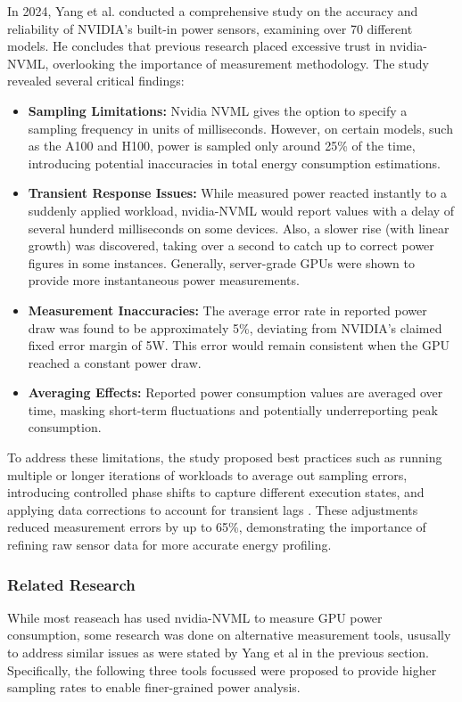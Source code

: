 In 2024, Yang et al. conducted a comprehensive study on the accuracy and reliability of NVIDIA's built-in power sensors, examining over 70 different models\cite{yang2024accurate}. He concludes that previous research placed excessive trust in nvidia-NVML, overlooking the importance of measurement methodology. The study revealed several critical findings:
\begin{itemize}
    \item \textbf{Sampling Limitations:} Nvidia NVML gives the option to specify a sampling frequency in units of milliseconds. However, on certain models, such as the A100 and H100, power is sampled only around 25\% of the time, introducing potential inaccuracies in total energy consumption estimations.
    \item \textbf{Transient Response Issues:} While measured power reacted instantly to a suddenly applied workload, nvidia-NVML would report values with a delay of several hunderd milliseconds on some devices. Also, a slower rise (with linear growth) was discovered, taking over a second to catch up to correct power figures in some instances. Generally, server-grade GPUs were shown to provide more instantaneous power measurements.
    \item \textbf{Measurement Inaccuracies:} The average error rate in reported power draw was found to be approximately 5\%, deviating from NVIDIA's claimed fixed error margin of 5W. This error would remain consistent when the GPU reached a constant power draw.
    \item \textbf{Averaging Effects:} Reported power consumption values are averaged over time, masking short-term fluctuations and potentially underreporting peak consumption.
\end{itemize}

To address these limitations, the study proposed best practices such as running multiple or longer iterations of workloads to average out sampling errors, introducing controlled phase shifts to capture different execution states, and applying data corrections to account for transient lags \cite{yang2024accurate}. These adjustments reduced measurement errors by up to 65\%, demonstrating the importance of refining raw sensor data for more accurate energy profiling.

\subsubsection{Related Research}
While most reaseach has used nvidia-NVML to measure GPU power consumption, some research was done on alternative measurement tools, ususally to address similar issues as were stated by Yang et al in the previous section. Specifically, the following three tools focussed were proposed to provide higher sampling rates to enable finer-grained power analysis.
